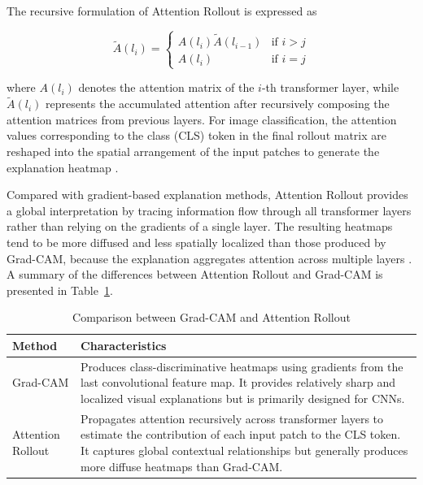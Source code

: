 The recursive formulation of Attention Rollout is expressed as

\begin{equation}
    \tilde{A}(l_{i}) = \begin{cases}
        {A}(l_{i}) \tilde{A}(l_{i-1})   & \text{if } i > j\\
        {A}(l_{i})                      & \text{if } i = j
    \end{cases}
    \label{attention_rollout_equation}
\end{equation}

where $A(l_i)$ denotes the attention matrix of the $i$-th transformer layer, while $\tilde{A}(l_i)$ represents the accumulated attention after recursively composing the attention matrices from previous layers.
For image classification, the attention values corresponding to the class (CLS) token in the final rollout matrix are reshaped into the spatial arrangement of the input patches to generate the explanation heatmap \cite{Abnar2020}.

Compared with gradient-based explanation methods, Attention Rollout provides a global interpretation by tracing information flow through all transformer layers rather than relying on the gradients of a single layer.
The resulting heatmaps tend to be more diffused and less spatially localized than those produced by Grad-CAM, because the explanation aggregates attention across multiple layers \cite{Cheng2025,Li2023}.
A summary of the differences between Attention Rollout and Grad-CAM is presented in Table~\ref{tab:gradcam_rollout}.

\begin{table}[htbp]
    \caption{Comparison between Grad-CAM and Attention Rollout}
    \label{tab:gradcam_rollout}
    \centering
    \setlength{\tabcolsep}{6pt}
    \begin{tabularx}{\columnwidth}{@{}>{\raggedright\arraybackslash}p{2.5cm} >{\raggedright\arraybackslash}X@{}}
        \toprule
        \textbf{Method} & \textbf{Characteristics} \\
        \midrule
        Grad-CAM &
        Produces class-discriminative heatmaps using gradients from the last convolutional feature map.
        It provides relatively sharp and localized visual explanations but is primarily designed for CNNs. \\

        \addlinespace
        Attention Rollout &
        Propagates attention recursively across transformer layers to estimate the contribution of each input patch to the CLS token.
        It captures global contextual relationships but generally produces more diffuse heatmaps than Grad-CAM. \\
        \bottomrule
    \end{tabularx}
\end{table}

